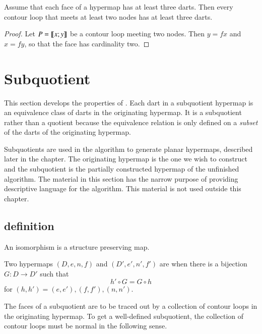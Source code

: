 \begin{lemma}\cutrate{}\label{lemma:3dart}  
Assume that each face of a hypermap  has at least three darts.
Then every contour loop that meets at least two nodes has at least
three darts.
\end{lemma}

\begin{proof} Let $P={\llbracket{x;y}\rrbracket}$ be a contour loop meeting two nodes.  Then
$y = f x$ and $x = f y$, so that the face has cardinality two.
\end{proof}


\section{Subquotient}
%

This section develops the properties of .  Each dart in a subquotient hypermap is an equivalence
class of darts in the originating hypermap.  It is a subquotient
rather than a quotient because the equivalence relation
is only defined on a {\it subset} of the darts of the originating
hypermap. 

Subquotients are used in the algorithm to generate planar hypermaps, described
later in the chapter.  The
originating hypermap is the one we wish to construct and the subquotient
is the partially constructed hypermap of the unfinished algorithm.  The material
in this section has the narrow purpose  of providing descriptive language for the
algorithm.  This material  is not  used outside this chapter.

\subsection{definition}

An isomorphism is a structure preserving map.

\begin{definition}[isomorphism]
 Two hypermaps $(D,e,n,f)$ and
$(D',e',n',f')$ are  when there is a bijection
$G:D\to D'$ such that
\[ h'\circ G = G\circ h\] 
for $(h,h')=(e,e'), (f,f'), (n,n')$.
%
%
\end{definition}

The faces of a subquotient are to be traced out by a collection of contour loops
in the originating hypermap.  To get a well-defined subquotient, the collection
of contour loops must be normal in the following sense.

